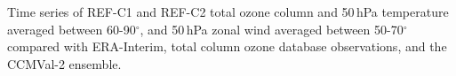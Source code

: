 \label{fig:time_series}
Time series of REF-C1 and REF-C2 total ozone column and 50\,hPa temperature averaged between 60-90$^{\circ}$, and 50\,hPa zonal wind averaged between 50-70$^{\circ}$ compared with ERA-Interim, total column ozone database observations, and the CCMVal-2 ensemble.